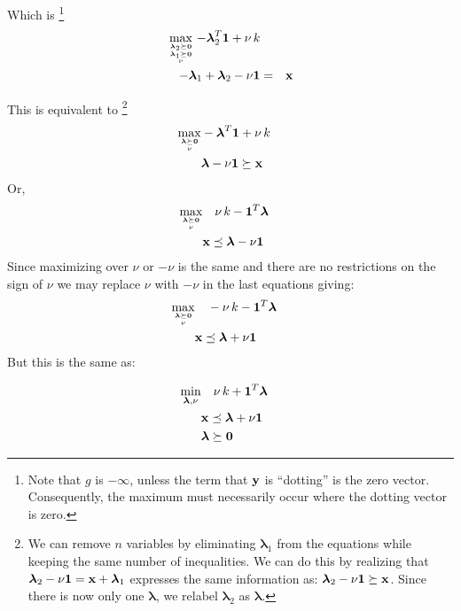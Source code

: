 \documentclass[12pt]{article}
\begin{document}
Which is%
\footnote{Note that $g$ is $-\infty$, unless the term that ${\bf y}$ is ``dotting'' is the zero vector. Consequently, the maximum
must necessarily occur where the dotting vector is zero.}
\begin{eqnarray}
	\mathop{\rm max}_{{{\boldsymbol \lambda}_2 \succeq {\bf 0}} \atop {{{\boldsymbol \lambda}_1 \succeq {\bf 0}} \atop \nu}} - {\boldsymbol \lambda}_2^T {\bf 1} + \nu \, k &&\\ 
	- {\boldsymbol \lambda}_1 + {\boldsymbol \lambda}_2 - \nu {\bf 1}  &=& {\bf x} 
\end{eqnarray}

This is equivalent to%
\footnote{We can remove $n$ variables by eliminating ${\boldsymbol \lambda}_1$ from the equations while keeping
	the same number of inequalities. We can do this by realizing that ${\boldsymbol \lambda}_2 - \nu {\bf 1} = {\bf x} + {\boldsymbol \lambda}_1$ 
	expresses the same information as: ${\boldsymbol \lambda}_2 - \nu {\bf 1} \succeq {\bf x}$. Since there is now only one ${\boldsymbol \lambda}$,
we relabel ${\boldsymbol \lambda}_2$ as ${\boldsymbol \lambda}$.}
\begin{eqnarray}
	\mathop{\rm max}_{{{\boldsymbol \lambda} \succeq {\bf 0}} \atop \nu} & - {\boldsymbol \lambda}^T {\bf 1} + \nu \, k & \\
																		 & {\boldsymbol \lambda} - \nu {\bf 1} \succeq {\bf x} & 
\end{eqnarray}
Or,
\begin{eqnarray}
	\mathop{\rm max}_{{{\boldsymbol \lambda} \succeq {\bf 0}} \atop \nu} & \quad \nu \, k - {\bf 1}^T {\boldsymbol \lambda} & \\ 
																		 &  {\bf x} \preceq {\boldsymbol \lambda} - \nu {\bf 1} &
 \end{eqnarray}
Since maximizing over $\nu$ or $-\nu$ is the same and there are no restrictions on the sign of $\nu$ we may replace $\nu$ with $-\nu$ 
in the last equations giving:
\begin{eqnarray}
	\mathop{\rm max}_{{{\boldsymbol \lambda} \succeq {\bf 0}} \atop \nu} & \quad -\nu \, k - {{\bf 1}^T \boldsymbol \lambda} & \\ 
																		 &  {\bf x} \preceq {\boldsymbol \lambda} + \nu {\bf 1} &
 \end{eqnarray}
But this is the same as:

\begin{eqnarray}
	\mathop{\rm min}_{{\boldsymbol \lambda}, \nu} & \quad \nu \, k + {\bf 1}^T {\boldsymbol \lambda} & \\ 
												  &  {\bf x} \preceq {\boldsymbol \lambda} + \nu {\bf 1} & \\
												  & {\boldsymbol \lambda} \succeq {\bf 0} & 
 \end{eqnarray}
\end{document}
